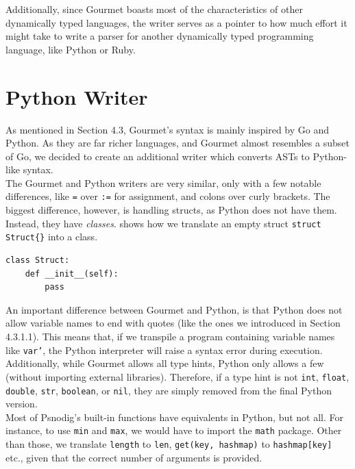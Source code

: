 Additionally, since Gourmet boasts most of the characteristics of other dynamically typed languages, the writer serves as a pointer to how much effort it might take to write a parser for another dynamically typed programming language, like Python or Ruby.

\section{Python Writer}

As mentioned in Section 4.3, Gourmet's syntax is mainly inspired by Go and Python. As they are far richer languages, and Gourmet almost resembles a subset of Go, we decided to create an additional writer which converts ASTs to Python-like syntax. \\

The Gourmet and Python writers are very similar, only with a few notable differences, like \texttt{=} over \texttt{:=} for assignment, and colons over curly brackets. The biggest difference, however, is handling structs, as Python does not have them. Instead, they have \textit{classes}.  shows how we translate an empty struct \texttt{struct Struct\{\}} into a class. \\

\begin{lstlisting}[caption={The Python equivalent of an empty struct in Gourmet.}, captionpos=b, label={The Python equivalent of an empty struct in Gourmet.}]
class Struct:
    def __init__(self):
        pass
\end{lstlisting}

An important difference between Gourmet and Python, is that Python does not allow variable names to end with quotes (like the ones we introduced in Section 4.3.1.1). This means that, if we transpile a program containing variable names like \texttt{var'}, the Python interpreter will raise a syntax error during execution. \\

Additionally, while Gourmet allows all type hints, Python only allows a few (without importing external libraries). Therefore, if a type hint is not \texttt{int}, \texttt{float}, \texttt{double}, \texttt{str}, \texttt{boolean}, or \texttt{nil}, they are simply removed from the final Python version. \\

Most of Psnodig's built-in functions have equivalents in Python, but not all. For instance, to use \texttt{min} and \texttt{max}, we would have to import the \texttt{math} package. Other than those, we translate \texttt{length} to \texttt{len}, \texttt{get(key, hashmap)} to \texttt{hashmap[key]} etc., given that the correct number of arguments is provided. \\


